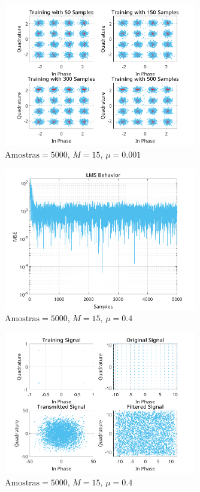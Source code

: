 \documentclass[a4paper,10pt]{article}
\begin{document}
\begin{enumerate}
				\begin{figure}[!ht]
					\centering
					\includegraphics[width=0.75\textwidth]{figs/L3Q6_B_t.png}
					\caption{$\text{Amostras} = 5000$, $M = 15$, $\mu = 0.001$}
					\label{fig:L3Q6B}
				\end{figure}

				\begin{figure}[!ht]
					\centering
					\includegraphics[width=0.75\textwidth]{figs/L3Q6_C_mse.png}
					\caption{$\text{Amostras} = 5000$, $M = 15$, $\mu = 0.4$}
					\label{fig:L3Q6C1}
				\end{figure}

				\begin{figure}[!ht]
					\centering
					\includegraphics[width=0.75\textwidth]{figs/L3Q6_C_t.png}
					\caption{$\text{Amostras} = 5000$, $M = 15$, $\mu = 0.4$}
					\label{fig:L3Q6C2}
				\end{figure}


\end{enumerate}
\end{document}
